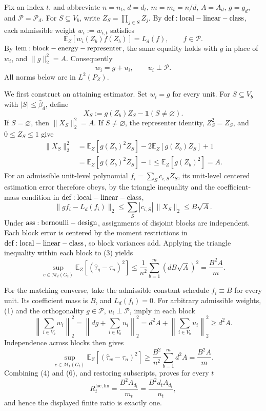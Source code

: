 Fix an index \(t\), and abbreviate \(n=n_t\), \(d=d_t\), \(m=m_t=n/d\), \(A=A_d\), \(g=g_d\), and \(\mathcal P=\mathcal P_d\). For \(S\subseteq V_b\), write \(Z_S=\prod_{j\in S}Z_j\). By \({\rm def:local-linear-class}\), each admissible weight \(w_i:=w_{i,t}\) satisfies
\[
\mathbb E_Z[w_i(Z_b)f(Z_b)]=L_d(f),\qquad f\in\mathcal P.
\]
By \({\rm lem:block-energy-representer}\), the same equality holds with \(g\) in place of \(w_i\), and \(\|g\|_2^2=A\). Consequently
\[
w_i=g+u_i,\qquad u_i\perp\mathcal P.
\tag{1}
\]
All norms below are in \(L^2(P_Z)\).

We first construct an attaining estimator. Set \(w_i=g\) for every unit. For \(S\subseteq V_b\) with \(|S|\le\bar\beta_d\), define
\[
X_S:=g(Z_b)Z_S-\mathbf1(S\ne\varnothing).
\]
If \(S=\varnothing\), then \(\|X_S\|_2^2=A\). If \(S\ne\varnothing\), the representer identity, \(Z_S^2=Z_S\), and \(0\le Z_S\le1\) give
\[
\begin{aligned}
\|X_S\|_2^2
&=\mathbb E_Z[g(Z_b)^2Z_S]-2\mathbb E_Z[g(Z_b)Z_S]+1\\
&=\mathbb E_Z[g(Z_b)^2Z_S]-1
\le \mathbb E_Z[g(Z_b)^2]=A.
\end{aligned}
\tag{2}
\]
For an admissible unit-level polynomial \(f_i=\sum_Sc_{i,S}Z_S\), its unit-level centered estimation error therefore obeys, by the triangle inequality and the coefficient-mass condition in \({\rm def:local-linear-class}\),
\[
\|g f_i-L_d(f_i)\|_2
\le\sum_S|c_{i,S}|\,\|X_S\|_2
\le B\sqrt A.
\tag{3}
\]
Under \({\rm ass:bernoulli-design}\), assignments of disjoint blocks are independent. Each block error is centered by the moment restrictions in \({\rm def:local-linear-class}\), so block variances add. Applying the triangle inequality within each block to (3) yields
\[
\sup_{c\in\mathcal M_t(G_t)}
\mathbb E_Z[(\widehat\tau_g-\tau_n)^2]
\le \frac1{n^2}\sum_{b=1}^m(dB\sqrt A)^2
=\frac{B^2A}{m}.
\tag{4}
\]

For the matching converse, take the admissible constant schedule \(f_i\equiv B\) for every unit. Its coefficient mass is \(B\), and \(L_d(f_i)=0\). For arbitrary admissible weights, (1) and the orthogonality \(g\in\mathcal P\), \(u_i\perp\mathcal P\), imply in each block
\[
\left\|\sum_{i\in V_b}w_i\right\|_2^2
=\left\|dg+\sum_{i\in V_b}u_i\right\|_2^2
=d^2A+\left\|\sum_{i\in V_b}u_i\right\|_2^2
\ge d^2A.
\tag{5}
\]
Independence across blocks then gives
\[
\sup_{c\in\mathcal M_t(G_t)}
\mathbb E_Z[(\widehat\tau_w-\tau_n)^2]
\ge\frac{B^2}{n^2}\sum_{b=1}^m d^2A
=\frac{B^2A}{m}.
\tag{6}
\]
Combining (4) and (6), and restoring subscripts, proves for every \(t\)
\[
R_t^{\mathrm{loc,lin}}=\frac{B^2A_{d_t}}{m_t}
=\frac{B^2d_tA_{d_t}}{n_t},
\]
and hence the displayed finite ratio is exactly one.

